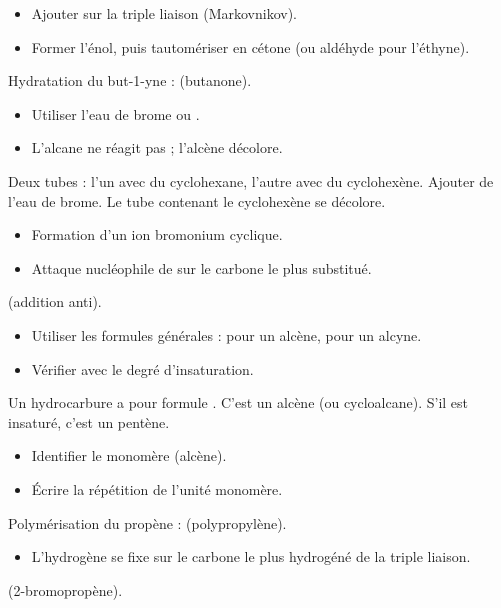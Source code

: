 \begin{itemize}
    \item Ajouter  sur la triple liaison (Markovnikov).
    \item Former l'énol, puis tautomériser en cétone (ou aldéhyde pour l'éthyne).
\end{itemize}
\begin{exemple}
Hydratation du but-1-yne :  (butanone).
\end{exemple}

\begin{itemize}
    \item Utiliser l'eau de brome ou .
    \item L'alcane ne réagit pas ; l'alcène décolore.
\end{itemize}
\begin{exemple}
Deux tubes : l'un avec du cyclohexane, l'autre avec du cyclohexène. Ajouter de l'eau de brome. Le tube contenant le cyclohexène se décolore.
\end{exemple}

\begin{itemize}
    \item Formation d'un ion bromonium cyclique.
    \item Attaque nucléophile de  sur le carbone le plus substitué.
\end{itemize}
\begin{exemple}
 (addition anti).
\end{exemple}

\begin{itemize}
    \item Utiliser les formules générales :  pour un alcène,  pour un alcyne.
    \item Vérifier avec le degré d'insaturation.
\end{itemize}
\begin{exemple}
Un hydrocarbure a pour formule . C'est un alcène (ou cycloalcane). S'il est insaturé, c'est un pentène.
\end{exemple}

\begin{itemize}
    \item Identifier le monomère (alcène).
    \item Écrire la répétition de l'unité monomère.
\end{itemize}
\begin{exemple}
Polymérisation du propène :  (polypropylène).
\end{exemple}

\begin{itemize}
    \item L'hydrogène se fixe sur le carbone le plus hydrogéné de la triple liaison.
\end{itemize}
\begin{exemple}
 (2-bromopropène).
\end{exemple}